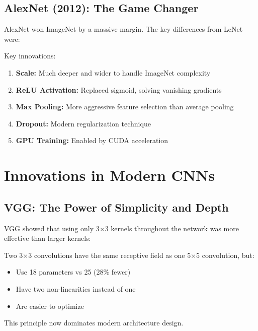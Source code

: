 \documentclass{article}
\begin{document}
\subsection{AlexNet (2012): The Game Changer}

AlexNet won ImageNet by a massive margin. The key differences from LeNet were:


Key innovations:
\begin{enumerate}
    \item \textbf{Scale:} Much deeper and wider to handle ImageNet complexity
    \item \textbf{ReLU Activation:} Replaced sigmoid, solving vanishing gradients
    \item \textbf{Max Pooling:} More aggressive feature selection than average pooling
    \item \textbf{Dropout:} Modern regularization technique
    \item \textbf{GPU Training:} Enabled by CUDA acceleration
\end{enumerate}

\section{Innovations in Modern CNNs}

\subsection{VGG: The Power of Simplicity and Depth}

VGG showed that using only 3×3 kernels throughout the network was more effective than larger kernels:


\begin{tcolorbox}[colback=green!5!white, colframe=green!50!black, title=Why 3×3 Kernels?]
Two 3×3 convolutions have the same receptive field as one 5×5 convolution, but:
\begin{itemize}
    \item Use 18 parameters vs 25 (28\% fewer)
    \item Have two non-linearities instead of one
    \item Are easier to optimize
\end{itemize}
This principle now dominates modern architecture design.
\end{tcolorbox}
\end{document}
